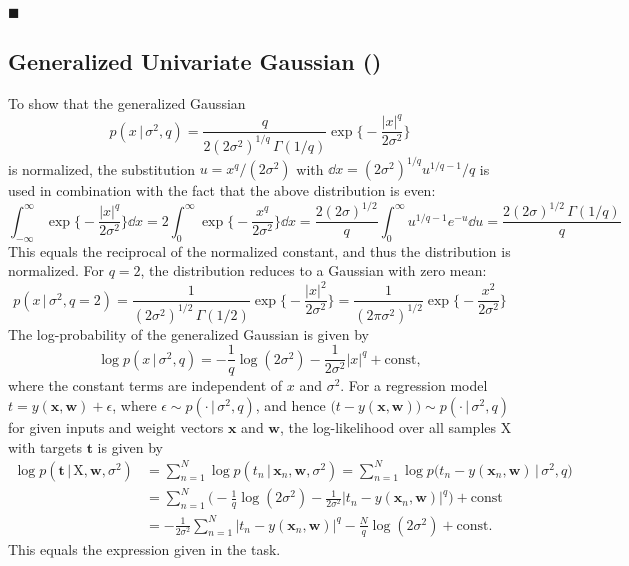 \documentclass[11pt, a4paper]{scrartcl}
\renewcommand{\vec}[1]{\bm{#1}}
\newcommand{\mat}[1]{\bm{\mathrm{#1}}}
\newcommand{\given}{\,\vert\,}
\newcommand{\biggiven}{\,\big\vert\,}
\newcommand{\eot}{\hfill\(\blacksquare\)}
\newcommand{\diffstar}{\texorpdfstring{\raisebox{-1pt}{\resizebox{!}{8pt}{\(\star\)}}}{*}}
\newcommand{\onestar}  {(\diffstar)}
\begin{document}
			\eot

		\subsection{Generalized Univariate Gaussian  \onestar}
			To show that the generalized Gaussian
			\begin{equation}
				p(x \given \sigma^2, q) = \frac{q}{2 (2\sigma^2)^{1/q} \,\Gamma(1/q)} \exp\bigg\{\!\! -\!\frac{\lvert x \rvert^q}{2 \sigma^2} \bigg\}
			\end{equation}
			is normalized, the substitution \( u = x^q / (2 \sigma^2) \) with \( \dd x = (2\sigma^2)^{1/q} u^{1/q - 1} / q \) is used in combination with the fact that the above distribution is even:
			\begin{equation}
				\int_{-\infty}^{\infty}\! \exp\bigg\{\!\! -\!\frac{\lvert x \rvert^q}{2 \sigma^2} \bigg\} \dd{x}
					= 2 \int_{0}^{\infty}\! \exp\bigg\{\!\! -\!\frac{x^q}{2 \sigma^2} \bigg\} \dd{x}
					= \frac{2 (2\sigma)^{1/2}}{q} \int_{0}^{\infty}\! u^{1/q - 1} e^{-u} \dd{u}
					= \frac{2 (2\sigma)^{1/2} \,\Gamma(1/q)}{q}
			\end{equation}
			This equals the reciprocal of the normalized constant, and thus the distribution is normalized. For \( q = 2 \), the distribution reduces to a Gaussian with zero mean:
			\begin{equation}
				p(x \given \sigma^2, q = 2)
					= \frac{1}{(2\sigma^2)^{1/2} \,\Gamma(1/2)} \exp\bigg\{\!\! -\!\frac{\lvert x \rvert^2}{2 \sigma^2} \bigg\}
					= \frac{1}{(2\pi\sigma^2)^{1/2}} \exp\bigg\{\!\! -\!\frac{x^2}{2 \sigma^2} \bigg\}
			\end{equation}
			The log-probability of the generalized Gaussian is given by
			\begin{equation}
				\log p(x \given \sigma^2, q) = -\frac{1}{q} \log(2\sigma^2) - \frac{1}{2 \sigma^2} \lvert x \rvert^q + \mathrm{const},
			\end{equation}
			where the constant terms are independent of \(x\) and \(\sigma^2\). For a regression model \( t = y(\vec{x}, \vec{w}) + \epsilon \), where \( \epsilon \sim p(\cdot \given \sigma^2, q) \), and hence \( \big( t - y(\vec{x}, \vec{w}) \big) \sim p(\cdot \given \sigma^2, q) \) for given inputs and weight vectors \(\vec{x}\) and \(\vec{w}\), the log-likelihood over all samples \(\mat{X}\) with targets \(\vec{t}\) is given by
			\begin{align}
				\log p(\vec{t} \given \mat{X}, \vec{w}, \sigma^2)
					&= \sum_{n = 1}^{N} \log p(t_n \given \vec{x}_n, \vec{w}, \sigma^2)
					 = \sum_{n = 1}^{N} \log p\big( t_n - y(\vec{x}_n, \vec{w}) \biggiven \sigma^2, q \big) \\
					&= \sum_{n = 1}^{N} \bigg( -\frac{1}{q} \log(2\sigma^2) - \frac{1}{2 \sigma^2} \big\lvert t_n - y(\vec{x}_n, \vec{w}) \big\rvert^q \bigg) + \mathrm{const} \\
					&= -\frac{1}{2 \sigma^2} \sum_{n = 1}^{N} \big\lvert t_n - y(\vec{x}_n, \vec{w}) \big\rvert^q - \frac{N}{q} \log(2\sigma^2) + \mathrm{const}.
			\end{align}
			This equals the expression given in the task.
\end{document}
